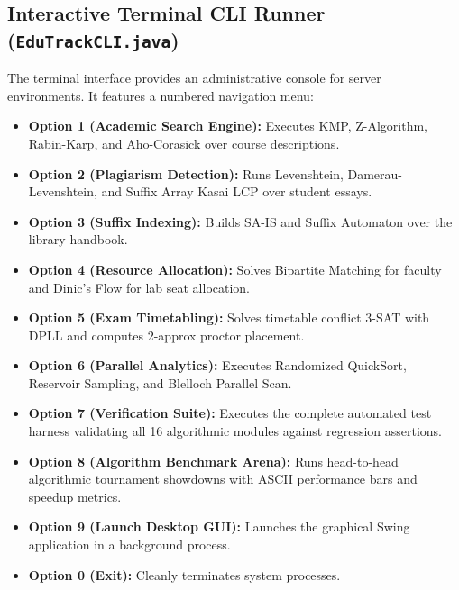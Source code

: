 \subsection{Interactive Terminal CLI Runner (\texttt{EduTrackCLI.java})}
The terminal interface provides an administrative console for server environments. It features a numbered navigation menu:
\begin{itemize}
    \item \textbf{Option 1 (Academic Search Engine):} Executes KMP, Z-Algorithm, Rabin-Karp, and Aho-Corasick over course descriptions.
    \item \textbf{Option 2 (Plagiarism Detection):} Runs Levenshtein, Damerau-Levenshtein, and Suffix Array Kasai LCP over student essays.
    \item \textbf{Option 3 (Suffix Indexing):} Builds SA-IS and Suffix Automaton over the library handbook.
    \item \textbf{Option 4 (Resource Allocation):} Solves Bipartite Matching for faculty and Dinic's Flow for lab seat allocation.
    \item \textbf{Option 5 (Exam Timetabling):} Solves timetable conflict 3-SAT with DPLL and computes 2-approx proctor placement.
    \item \textbf{Option 6 (Parallel Analytics):} Executes Randomized QuickSort, Reservoir Sampling, and Blelloch Parallel Scan.
    \item \textbf{Option 7 (Verification Suite):} Executes the complete automated test harness validating all 16 algorithmic modules against regression assertions.
    \item \textbf{Option 8 (Algorithm Benchmark Arena):} Runs head-to-head algorithmic tournament showdowns with ASCII performance bars and speedup metrics.
    \item \textbf{Option 9 (Launch Desktop GUI):} Launches the graphical Swing application in a background process.
    \item \textbf{Option 0 (Exit):} Cleanly terminates system processes.
\end{itemize}

